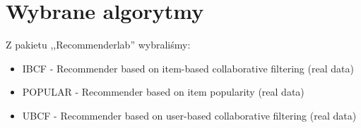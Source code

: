 \documentclass[12pt, a4paper]{article}
\begin{document}





\section{Wybrane algorytmy}
Z pakietu ,,Recommenderlab'' wybraliśmy:

\begin{itemize}
\item IBCF - Recommender based on item-based collaborative filtering (real data)
\item POPULAR - Recommender based on item popularity (real data)
\item UBCF - Recommender based on user-based collaborative filtering (real data)
\end{itemize}
\end{document}
